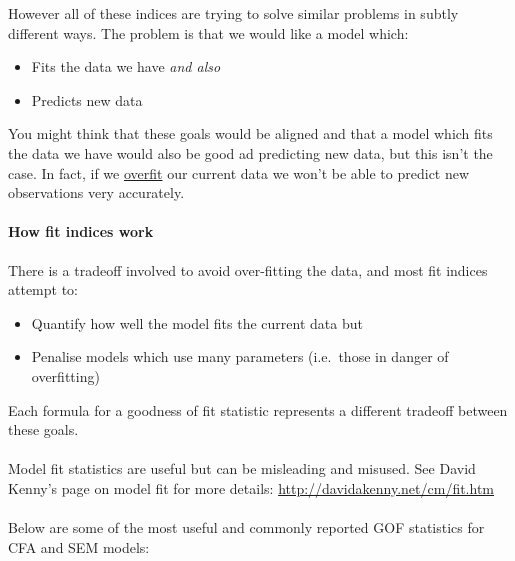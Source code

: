 \documentclass[]{article}
\providecommand{\tightlist}{%
  \setlength{\itemsep}{0pt}\setlength{\parskip}{0pt}}
\let\oldparagraph\paragraph
\renewcommand{\paragraph}[1]{\oldparagraph{#1}\mbox{}}
\theoremstyle{definition}
\theoremstyle{definition}
\theoremstyle{definition}
\theoremstyle{remark}
\begin{document}
However all of these indices are trying to solve similar problems in
subtly different ways. The problem is that we would like a model which:

\begin{itemize}
\tightlist
\item
  Fits the data we have \emph{and also}
\item
  Predicts new data
\end{itemize}

You might think that these goals would be aligned and that a model which
fits the data we have would also be good ad predicting new data, but
this isn't the case. In fact, if we
\protect\hyperlink{over-fitting}{overfit} our current data we won't be
able to predict new observations very accurately.

\paragraph{How fit indices work}\label{how-fit-indices-work}

There is a tradeoff involved to avoid over-fitting the data, and most
fit indices attempt to:

\begin{itemize}
\tightlist
\item
  Quantify how well the model fits the current data but
\item
  Penalise models which use many parameters (i.e.~those in danger of
  overfitting)
\end{itemize}

Each formula for a goodness of fit statistic represents a different
tradeoff between these goals.

\paragraph{}\label{section-20}

Model fit statistics are useful but can be misleading and misused. See
David Kenny's page on model fit for more details:
\url{http://davidakenny.net/cm/fit.htm}

\hypertarget{common-fit-indices}{\paragraph{}\label{common-fit-indices}}

Below are some of the most useful and commonly reported GOF statistics
for CFA and SEM models:
\end{document}
